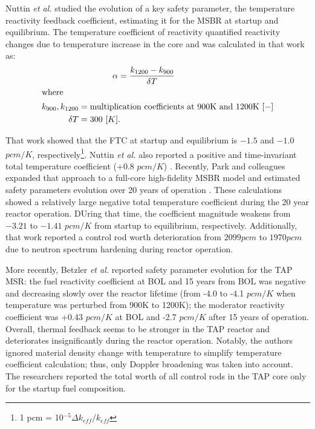 Nuttin \emph{et al.} studied the evolution of a key safety parameter, the 
temperature reactivity feedback coefficient, estimating it for the \gls{MSBR} 
at startup and equilibrium. The temperature coefficient of reactivity 
quantified reactivity changes due to temperature increase in the core and was 
calculated in that work as:
\begin{align}\label{eq:feedback}
	&\qquad\qquad \alpha = \frac{k_{1200} - k_{900}}{\delta 
	T} \\
	\intertext{where}
	k_{900}, k_{1200}  &= \mbox{multiplication coefficients at 900K and 
		1200K $[-]$} \nonumber \\
	\delta T &= \mbox{300 $[K]$.}\nonumber
\end{align}

That work showed that the \gls{FTC} at startup and equilibrium is $-1.5$ 
and $-1.0$ $pcm/K$, respectively\footnote{ 1 pcm = 10$^{-5}\Delta 
k_{eff}/k_{eff}$}. Nuttin \emph{et al.} also reported a positive and 
time-invariant total temperature coefficient ($+0.8$ $pcm/K$) 
\cite{nuttin_potential_2005}. Recently, Park and colleagues expanded that 
approach to a full-core high-fidelity \gls{MSBR} model and estimated safety 
parameters evolution over 20 years of operation \cite{park_whole_2015}. These 
calculations showed a relatively large negative total temperature coefficient 
during the 20 year reactor operation. DUring that time, the coefficient 
magnitude weakens from $-3.21$ to $-1.41$ $pcm/K$ from startup to equilibrium, 
respectively. Additionally, that work reported a control rod worth 
deterioration from $2099pcm$ to $1970pcm$ due to neutron spectrum hardening 
during reactor operation. 

More recently, Betzler \emph{et al.} \cite{betzler_assessment_2017-1} reported 
safety parameter evolution for the \gls{TAP} \gls{MSR}: the fuel 
reactivity coefficient at \gls{BOL} and 15 years from \gls{BOL} was negative 
and decreasing slowly over the reactor lifetime (from -4.0 to -4.1 $pcm/K$ 
when temperature was perturbed from 900K to 1200K); the moderator reactivity 
coefficient was +0.43 $pcm/K$ at \gls{BOL} and -2.7 $pcm/K$ after 15 
years of operation. Overall, thermal feedback seems to be stronger in the 
\gls{TAP} reactor and deteriorates insignificantly during the reactor 
operation. Notably, the authors ignored material density change with 
temperature to simplify temperature coefficient calculation; thus, only  
Doppler broadening was taken into account. The researchers reported the total 
worth of all control rods in the \gls{TAP} core only for the startup fuel 
composition. 

